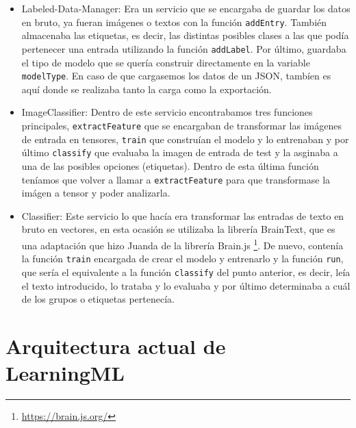 \documentclass[a4paper, 12pt]{book}
\begin{document}
\begin{itemize}
  
	\item Labeled-Data-Manager: Era un servicio que se encargaba de guardar los datos en bruto, ya fueran imágenes o textos con la función \texttt{addEntry}. También almacenaba las etiquetas, es decir, las distintas posibles clases a las que podía pertenecer una entrada utilizando la función \texttt{addLabel}. Por último, guardaba el tipo de modelo que se quería construir directamente en la variable \texttt{modelType}. En caso de que cargasemos los datos de un JSON, tambíen es aquí donde se realizaba tanto la carga como la exportación.
 
	\item ImageClassifier: Dentro de este servicio encontrabamos tres funciones principales, \texttt{extractFeature} que se encargaban de transformar las imágenes de entrada en tensores, \texttt{train} que construían el modelo y lo entrenaban y por último \texttt{classify} que evaluaba la imagen de entrada de test y la asginaba a una de las posibles opciones (etiquetas). Dentro de esta última función teníamos que volver a llamar a \texttt{extractFeature} para que transformase la imágen a tensor y poder analizarla.

	\item Classifier: Este servicio lo que hacía era transformar las entradas de texto en bruto en vectores, en esta ocasión se utilizaba la librería BrainText, que es una adaptación que hizo Juanda de la librería Brain.js \footnote{\url{https://brain.js.org/}}. De nuevo, contenía la función \texttt{train} encargada de crear el modelo y entrenarlo y la función \texttt{run}, que sería el equivalente a la función  \texttt{classify} del punto anterior, es decir, leía el texto introducido, lo trataba y lo evaluaba y por último determinaba a cuál de los grupos o etiquetas pertenecía.

\end{itemize}

\section{Arquitectura actual de LearningML} 
\label{sec:arquitecturaactual}
\end{document}
